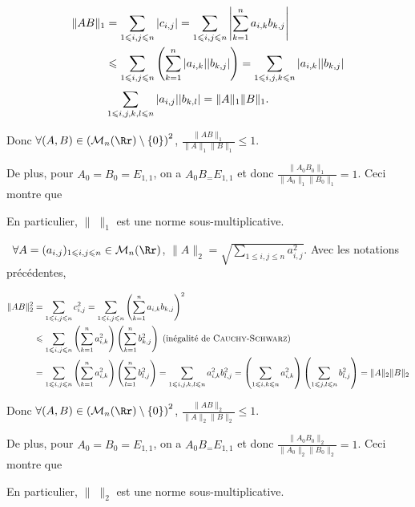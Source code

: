 {\begin{enumerate}
{\begin{align*}\ensuremath
\|AB\|_1&=\sum_{1\leqslant i,j\leqslant n}^{}|c_{i,j}|=\sum_{1\leqslant i,j\leqslant n}^{}\left|\sum_{k=1}^{n}a_{i,k}b_{k,j}\right|\\
 &\leqslant\sum_{1\leqslant i,j\leqslant n}^{}\left(\sum_{k=1}^{n}|a_{i,k}||b_{k,j}|\right)=\sum_{1\leqslant i,j,k\leqslant n}^{}|a_{i,k}||b_{k,j}|\\
 &\sum_{1\leqslant i,j,k,l\leqslant n}^{}|a_{i,j}||b_{k,l}|=\|A\|_1\|B\|_1.
\end{align*}

Donc $\forall(A,B)\in\left(\mathcal{M}_n(\Rr)\setminus\{0\}\right)^2$, $ \frac{\|AB\|_1}{\|A\|_1\|B\|_1}\leqslant 1$.

De plus, pour $A_0=B_0=E_{1,1}$, on a $A_0B_=E_{1,1}$ et donc $ \frac{\|A_0B_0\|_1}{\|A_0\|_1\|B_0\|_1}=1$. Ceci montre que

\begin{center}
\end{center}

En particulier, $\|\;\|_1$ est une norme sous-multiplicative.

\textbullet~$\forall A=(a_{i,j})_{1\leqslant i,j\leqslant n}\in\mathcal{M}_n(\Rr)$, $\|A\|_2=\sqrt{\sum_{1\leqslant i,j\leqslant n}^{}a_{i,j}^2}$. Avec les notations précédentes,

\begin{align*}\ensuremath
\|AB\|_2^2&=\sum_{1\leqslant i,j\leqslant n}^{}c_{i,j}^2=\sum_{1\leqslant i,j\leqslant n}^{}\left(\sum_{k=1}^{n}a_{i,k}b_{k,j}\right)^2\\
 &\leqslant\sum_{1\leqslant i,j\leqslant n}^{}\left(\sum_{k=1}^{n}a_{i,k}^2\right)\left(\sum_{k=1}^{n}b_{k,j}^2\right)\;(\text{inégalité de \textsc{Cauchy}-\textsc{Schwarz}})\\
 &=\sum_{1\leqslant i,j\leqslant n}^{}\left(\sum_{k=1}^{n}a_{i,k}^2\right)\left(\sum_{l=1}^{n}b_{l,j}^2\right)=\sum_{1\leqslant i,j,k,l\leqslant n}^{}a_{i,k}^2b_{l,j}^2=\left(\sum_{1\leqslant i,k\leqslant n}^{}a_{i,k}^2\right)\left(\sum_{1\leqslant j,l\leqslant n}^{}b_{l,j}^2\right)=\|A\|_2\|B\|_2
\end{align*}

Donc $\forall(A,B)\in\left(\mathcal{M}_n(\Rr)\setminus\{0\}\right)^2$, $ \frac{\|AB\|_2}{\|A\|_2\|B\|_2}\leqslant 1$.

De plus, pour $A_0=B_0=E_{1,1}$, on a $A_0B_=E_{1,1}$ et donc $ \frac{\|A_0B_0\|_2}{\|A_0\|_2\|B_0\|_2}=1$. Ceci montre que

\begin{center}
\end{center}

En particulier, $\|\;\|_2$ est une norme sous-multiplicative.
}
\end{enumerate}
}

